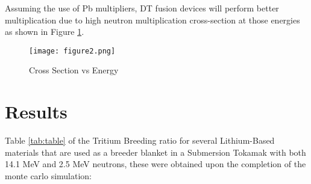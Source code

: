 \documentclass{article}
\begin{document}
Assuming the use of Pb multipliers, DT fusion devices will perform better multiplication due to high neutron multiplication cross-section at those energies as shown in Figure \ref{fig:fig2}.

\begin{figure}[hbt!]
  \centering
  \texttt{[image: figure2.png]}
  \caption{Cross Section vs Energy \cite{chadwick}}
  \label{fig:fig2}
\end{figure}

\section{Results}

Table \ref{tab:table} of the Tritium Breeding ratio for several Lithium-Based materials that are used as a breeder blanket in a Submersion Tokamak with both 14.1 MeV and 2.5 MeV neutrons, these were obtained upon the completion of the monte carlo simulation:
\end{document}
